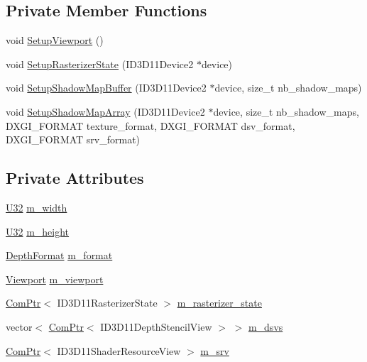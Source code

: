\subsection*{Private Member Functions}
\begin{DoxyCompactItemize}
\item 
void \hyperlink{structmage_1_1_shadow_map_buffer_aacabad92fb9c0bf81cf2f3c1fbae9f13}{Setup\+Viewport} ()
\item 
void \hyperlink{structmage_1_1_shadow_map_buffer_ab36561e9927e59c99100777875f6ce3b}{Setup\+Rasterizer\+State} (I\+D3\+D11\+Device2 $\ast$device)
\item 
void \hyperlink{structmage_1_1_shadow_map_buffer_a359a1174cfa0e95e8988a16343f47643}{Setup\+Shadow\+Map\+Buffer} (I\+D3\+D11\+Device2 $\ast$device, size\+\_\+t nb\+\_\+shadow\+\_\+maps)
\item 
void \hyperlink{structmage_1_1_shadow_map_buffer_a6bafee84f640806c85352f77847f55ef}{Setup\+Shadow\+Map\+Array} (I\+D3\+D11\+Device2 $\ast$device, size\+\_\+t nb\+\_\+shadow\+\_\+maps, D\+X\+G\+I\+\_\+\+F\+O\+R\+M\+AT texture\+\_\+format, D\+X\+G\+I\+\_\+\+F\+O\+R\+M\+AT dsv\+\_\+format, D\+X\+G\+I\+\_\+\+F\+O\+R\+M\+AT srv\+\_\+format)
\end{DoxyCompactItemize}
\subsection*{Private Attributes}
\begin{DoxyCompactItemize}
\item 
\hyperlink{namespacemage_a41c104c036fba3756a74e19f793eeaa1}{U32} \hyperlink{structmage_1_1_shadow_map_buffer_ac8c9e5e52c31c9d358e4bb0f306439a6}{m\+\_\+width}
\item 
\hyperlink{namespacemage_a41c104c036fba3756a74e19f793eeaa1}{U32} \hyperlink{structmage_1_1_shadow_map_buffer_a4e4048bd48e7cd347729f1a675a73ed3}{m\+\_\+height}
\item 
\hyperlink{namespacemage_aed4c3f883a30484d0a20762c06be81d4}{Depth\+Format} \hyperlink{structmage_1_1_shadow_map_buffer_a84ec323bfc88313547f21051b2b70637}{m\+\_\+format}
\item 
\hyperlink{structmage_1_1_viewport}{Viewport} \hyperlink{structmage_1_1_shadow_map_buffer_a5dd4126af774f674f69280f53dd8393d}{m\+\_\+viewport}
\item 
\hyperlink{namespacemage_ae74f374780900893caa5555d1031fd79}{Com\+Ptr}$<$ I\+D3\+D11\+Rasterizer\+State $>$ \hyperlink{structmage_1_1_shadow_map_buffer_a46cf9e88e20431629f6622e3647fd58b}{m\+\_\+rasterizer\+\_\+state}
\item 
vector$<$ \hyperlink{namespacemage_ae74f374780900893caa5555d1031fd79}{Com\+Ptr}$<$ I\+D3\+D11\+Depth\+Stencil\+View $>$ $>$ \hyperlink{structmage_1_1_shadow_map_buffer_acea16328aa086a093ad3f2ef54eb5f4a}{m\+\_\+dsvs}
\item 
\hyperlink{namespacemage_ae74f374780900893caa5555d1031fd79}{Com\+Ptr}$<$ I\+D3\+D11\+Shader\+Resource\+View $>$ \hyperlink{structmage_1_1_shadow_map_buffer_af313b37ddc41f91e949d015086f6ba18}{m\+\_\+srv}
\end{DoxyCompactItemize}


